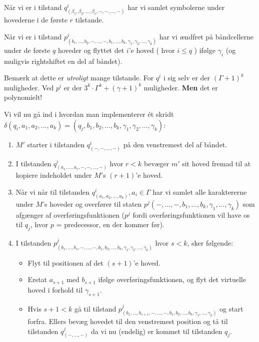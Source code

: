 Når vi er i tilstand $q^{i}_{(\beta_{1}, \beta_{2}, \ldots, \beta_{r}, -, -, \ldots, -)}$ har vi samlet symbolerne under hovederne i de første $r$ tilstande.

Når vi er i tilstand $p^{i}_{(b_{1}, \ldots, b_{q}, -, \ldots, -, b_{1}, \ldots, b_{k}, \gamma_{1}, \gamma_{2}, \ldots, \gamma_{k})}$ har vi ændfret på båndcellerne under de første $q$ hoveder og flyttet det $i$'e hoved ( hvor $i \le q$ ) ifølge $\gamma_{i}$ (og muligvis rightshiftet en del af båndet).

Bemærk at dette er \textit{utroligt} mange tilstande. For $q^{i}$ i sig selv er der $(\Gamma+1)^{k}$ muligheder. Ved $p^{i}$ er der $3^{k} \cdot \Gamma^{k} + (\gamma+1)^{k}$ muligheder. \textbf{Men} det er polynomielt!

Vi vil nu gå ind i hvordan man implementerer ét skridt \(\delta(q_{i}, a_{1}, a_{2}, \ldots, a_{k}) = (q_{j}, b_{1}, b_{2}, \ldots, b_{k}, \gamma_{1}, \gamma_{2}, \ldots, \gamma_{k})\):
\begin{enumerate}
	\item $M'$ starter i tilstanden $q^{i}_{(-,-,\ldots, -)}$ på den venstremest del af båndet.
	\item I tilstanden $q^{i}_{(a_{1}, \ldots, a_{r}, -,-, \ldots, -)}$ hvor $r < k$ bevæger $m'$ sit hoved fremad til at kopiere indeholdet under $M'$s $(r+1)$'e hoved.
	\item Når vi når til tilstanden $q^{i}_{(a_{1}, a_{2}, \ldots, a_{k})}, a_{i} \in \Gamma$ har vi samlet alle karaktererne under $M$'s hoveder og overfører til staten $p^{j}(-,\ldots,-,b_{1},\ldots, b_{k}, \gamma_{1}, \ldots, \gamma_{k})$ som afgænger af overføringsfunktionen ($p^{j}$ fordi overføringsfunktionen vil have os til $q_{j}$, hvor $p$ = predecessor, en der kommer før).
	\item I tilstanden $p^{j}_{(b_{1}, \ldots, b_{s}, -, \ldots, -, b_{1}, b_{2}, \ldots, b_{k}, \gamma_{1}, \gamma_{2}, \ldots, \gamma_{k})}$ hvor $s < k$, sker følgende:
	      \begin{itemize}
		      \item Flyt til positionen af det $(s+1)$'e hoved.
		      \item Erstat $a_{s+1}$ med $b_{s+1}$ ifølge overføringsfunktionen, og flyt det virtuelle hoved i forhold til \(\gamma_{s+1}\).
		      \item  Hvis $s+1 < k$ gå til tilstand $p^{j}_{(b_{1}, \ldots, b_{s+1}, - , \ldots, - , b_{1}, b_{2}, \ldots, b_{k}, \gamma_{1}, \ldots, \gamma_{k})}$ og start forfra. Ellers bevæg hovedet til den venstremest position og tå til tilstanden $q^{j}_{(-, \ldots, -)}$ da vi nu (endelig) er kommet til tilstanden $q_{j}$.
	      \end{itemize}
\end{enumerate}

